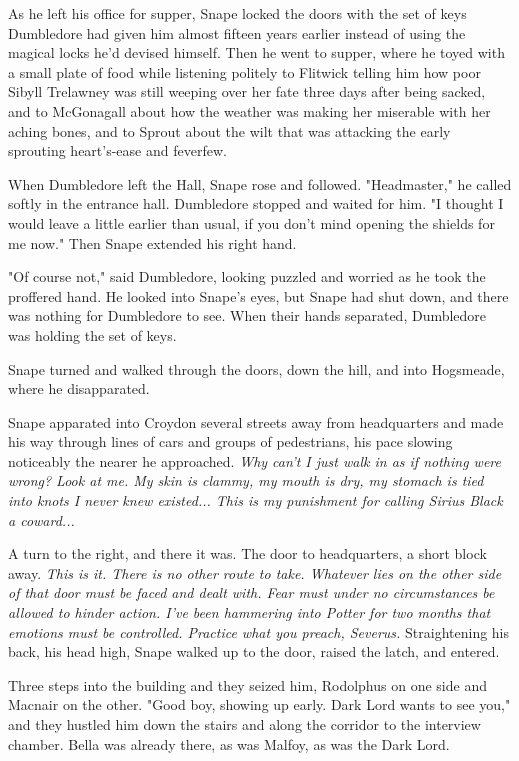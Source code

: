 As he left his office for supper, Snape locked the doors with the set of keys Dumbledore had given him almost fifteen years earlier instead of using the magical locks he'd devised himself. Then he went to supper, where he toyed with a small plate of food while listening politely to Flitwick telling him how poor Sibyll Trelawney was still weeping over her fate three days after being sacked, and to McGonagall about how the weather was making her miserable with her aching bones, and to Sprout about the wilt that was attacking the early sprouting heart's-ease and feverfew.

When Dumbledore left the Hall, Snape rose and followed. "Headmaster," he called softly in the entrance hall. Dumbledore stopped and waited for him. "I thought I would leave a little earlier than usual, if you don't mind opening the shields for me now." Then Snape extended his right hand.

"Of course not," said Dumbledore, looking puzzled and worried as he took the proffered hand. He looked into Snape's eyes, but Snape had shut down, and there was nothing for Dumbledore to see. When their hands separated, Dumbledore was holding the set of keys.

Snape turned and walked through the doors, down the hill, and into Hogsmeade, where he disapparated.

\sbreak

Snape apparated into Croydon several streets away from headquarters and made his way through lines of cars and groups of pedestrians, his pace slowing noticeably the nearer he approached. \emph{Why can't I just walk in as if nothing were wrong? Look at me. My skin is clammy, my mouth is dry, my stomach is tied into knots I never knew existed... This is my punishment for calling Sirius Black a coward...}

A turn to the right, and there it was. The door to headquarters, a short block away. \emph{This is it. There is no other route to take. Whatever lies on the other side of that door must be faced and dealt with. Fear must under no circumstances be allowed to hinder action. I've been hammering into Potter for two months that emotions must be controlled. Practice what you preach, Severus.} Straightening his back, his head high, Snape walked up to the door, raised the latch, and entered.

Three steps into the building and they seized him, Rodolphus on one side and Macnair on the other. "Good boy, showing up early. Dark Lord wants to see you," and they hustled him down the stairs and along the corridor to the interview chamber. Bella was already there, as was Malfoy, as was the Dark Lord.

